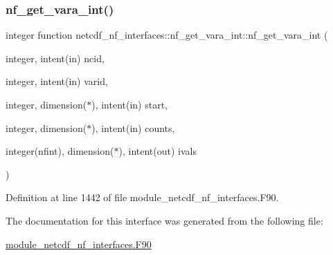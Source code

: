 \subsubsection{\texorpdfstring{nf\+\_\+get\+\_\+vara\+\_\+int()}{nf\_get\_vara\_int()}}
{\footnotesize\ttfamily integer function netcdf\+\_\+nf\+\_\+interfaces\+::nf\+\_\+get\+\_\+vara\+\_\+int\+::nf\+\_\+get\+\_\+vara\+\_\+int (\begin{DoxyParamCaption}\item[{integer, intent(in)}]{ncid,  }\item[{integer, intent(in)}]{varid,  }\item[{integer, dimension($\ast$), intent(in)}]{start,  }\item[{integer, dimension($\ast$), intent(in)}]{counts,  }\item[{integer(nfint), dimension($\ast$), intent(out)}]{ivals }\end{DoxyParamCaption})}



Definition at line 1442 of file module\+\_\+netcdf\+\_\+nf\+\_\+interfaces.\+F90.



The documentation for this interface was generated from the following file\+:\begin{DoxyCompactItemize}
\item 
\hyperlink{module__netcdf__nf__interfaces_8F90}{module\+\_\+netcdf\+\_\+nf\+\_\+interfaces.\+F90}\end{DoxyCompactItemize}
